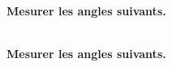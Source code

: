 







\hfill
\hfill

\nom

\hfill
\hfill


\exercice \diff[1] \\
\textbf{Mesurer les angles suivants.}

\begin{multicols}{3}








\end{multicols}

\begin{multicols}{3}







\end{multicols}


\newpage
\exercice \diff[2] \\
\textbf{Mesurer les angles suivants.}

\begin{multicols}{3}








\end{multicols}

\begin{multicols}{3}







\end{multicols}



